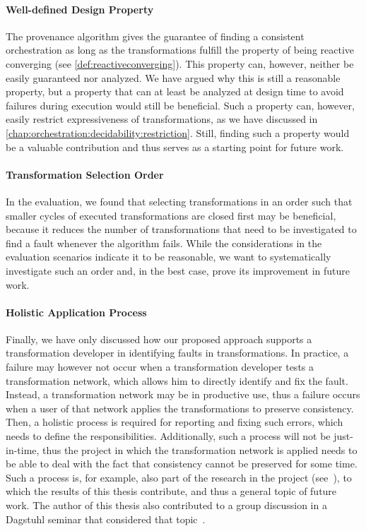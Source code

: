 \paragraph{Well-defined Design Property}
The provenance algorithm gives the guarantee of finding a consistent orchestration as long as the transformations fulfill the property of being reactive converging (see \autoref{def:reactiveconverging}).
This property can, however, neither be easily guaranteed nor analyzed.
We have argued why this is still a reasonable property, but a property that can at least be analyzed at design time to avoid failures during execution would still be beneficial.
Such a property can, however, easily restrict expressiveness of transformations, as we have discussed in \autoref{chap:orchestration:decidability:restriction}.
Still, finding such a property would be a valuable contribution and thus serves as a starting point for future work.

\paragraph{Transformation Selection Order}
In the evaluation, we found that selecting transformations in an order such that smaller cycles of executed transformations are closed first may be beneficial, because it reduces the number of transformations that need to be investigated to find a fault whenever the algorithm fails.
While the considerations in the evaluation scenarios indicate it to be reasonable, we want to systematically investigate such an order and, in the best case, prove its improvement in future work.

\paragraph{Holistic Application Process}
Finally, we have only discussed how our proposed approach supports a transformation developer in identifying faults in transformations.
In practice, a failure may however not occur when a transformation developer tests a transformation network, which allows him to directly identify and fix the fault.
Instead, a transformation network may be in productive use, thus a failure occurs when a user of that network applies the transformations to preserve consistency.
Then, a holistic process is required for reporting and fixing such errors, which needs to define the responsibilities.
Additionally, such a process will not be just-in-time, thus the project in which the transformation network is applied needs to be able to deal with the fact that consistency cannot be preserved for some time.
Such a process is, for example, also part of the research in the \vitruv project (see~), to which the results of this thesis contribute, and thus a general topic of future work.
The author of this thesis also contributed to a group discussion in a Dagstuhl seminar that considered that topic~.


